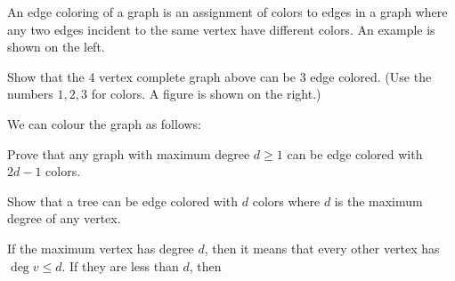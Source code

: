\documentclass[11pt]{article}
\begin{document}
An edge coloring of a graph is an assignment of colors to edges in a graph where any two edges incident to the same vertex have different colors. An example is shown on the left.

\begin{center}
\end{center}

\begin{Parts}
\Part Show that the 4 vertex complete graph above can be 3 edge colored. (Use the numbers $1,2,3$ for colors. A figure is shown on the right.)

\begin{solution}
    We can colour the graph as follows: 

    \begin{center}
    \end{center}
\end{solution}

\Part Prove that any graph with maximum degree $d \geq 1$ can be edge colored with $2d-1$ colors. 



\Part Show that a tree can be edge colored with $d$ colors where $d$ is the maximum degree of any vertex.


\begin{solution}
    If the maximum vertex has degree $d$, then it means that every other vertex has $\deg v \leq d$. If they are less than $d$, then 
\end{solution}

\end{Parts}
\end{document}

